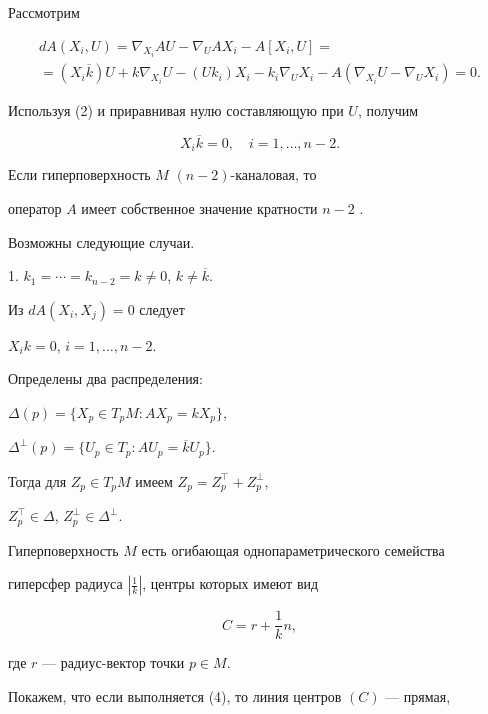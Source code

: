 Рассмотрим


\begin{multline}


dA(X_i,U)=\nabla_{X_i}AU-\nabla_U AX_i-A[X_i,U]=\\


=(X_i\overline{k})U+


k\nabla_{X_i}U-(Uk_i)X_i-k_i\nabla_UX_i-A(\nabla_{X_i}U-\nabla_UX_i)=0.


\end{multline}


Используя (2) и приравнивая нулю составляющую при $U$, получим


\begin{equation}


X_i\overline{k}=0,\quad i=1,\dotsc, n-2.


\end{equation}





Если гиперповерхность $M$\; $(n-2)$-каналовая, то


оператор $A$ имеет собственное значение кратности $n-2$ \cite{3}.


Возможны следующие случаи.


\smallskip





1. $k_1=\dotsb =k_{n-2}=k\ne 0$, $k\ne \overline{k}$.


Из $dA(X_i,X_j)=0$ следует


$X_ik=0$, $i=1,\dotsc, n-2$.


Определены два распределения:


$\Delta(p)=\{X_p\in T_pM:AX_p=kX_p\}$,


$\Delta^{\bot}(p)=\{U_p\in T_p:AU_p=\overline{k}U_p\}$.


Тогда для $Z_p\in T_pM$ имеем $Z_p=Z_p^{\top}+Z_p^{\bot}$,


$Z_p^{\top}\in\Delta$, $Z_p^{\bot}\in \Delta^{\bot}$.


Гиперповерхность $M$ есть огибающая однопараметрического семейства


гиперсфер радиуса $|\frac{1}{k}|$, центры которых имеют вид


$$


C = r +\frac{1}{k} n,


$$


где $r$ --- радиус-вектор точки $p\in M$.


Покажем, что если выполняется (4), то линия центров $(C)$ --- прямая,


